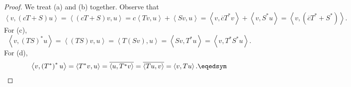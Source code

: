 \documentclass[linearalgebra]{subfiles}
\begin{document}
    \begin{proof}
        We treat (a) and (b) together. Observe that
        \begin{equation*}
            \left\langle v, \left( cT+S \right)u \right\rangle = \left\langle \left( cT+S \right) v, u\right\rangle = c\left\langle Tv, u\right\rangle + \left\langle Sv, u\right\rangle  = \left\langle v, \overline{c} T^*v\right\rangle + \left\langle v, S^*u\right\rangle = \left\langle v, \left( \overline{c} T^*+S^* \right) \right\rangle .
        \end{equation*}
        For (c),
        \begin{equation*}
            \left\langle v, \left( TS \right) ^*u\right\rangle = \left\langle \left( TS \right) v, u\right\rangle = \left\langle T\left( Sv \right) ,u\right\rangle = \left\langle Sv, T^*u\right\rangle = \left\langle v, T^*S^*u\right\rangle . 
        \end{equation*}
        For (d),
        \begin{equation*}
            \left\langle v, \left( T^* \right) ^*u\right\rangle = \left\langle T^*v, u\right\rangle = \overline{\left\langle u, T^*v\right\rangle} = \overline{\left\langle Tu, v\right\rangle}  = \left\langle v, Tu\right\rangle . \eqedsym
        \end{equation*}
    \end{proof}
\end{document}
